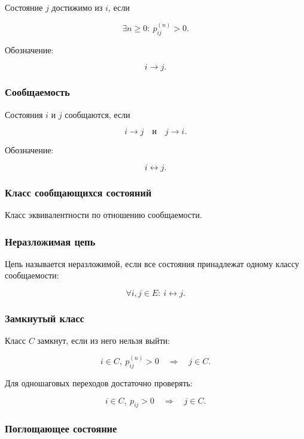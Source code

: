 \documentclass[
  11pt,
  a4paper,
]{article}
\begin{document}
Состояние \(j\) достижимо из \(i\), если

\[
\exists n\ge0:\ p_{ij}^{(n)}>0.
\]

Обозначение:

\[
i\to j.
\]

\subsubsection{Сообщаемость}\label{ux441ux43eux43eux431ux449ux430ux435ux43cux43eux441ux442ux44c}

Состояния \(i\) и \(j\) сообщаются, если

\[
i\to j
\quad\text{и}\quad
j\to i.
\]

Обозначение:

\[
i\leftrightarrow j.
\]

\subsubsection{Класс сообщающихся
состояний}\label{ux43aux43bux430ux441ux441-ux441ux43eux43eux431ux449ux430ux44eux449ux438ux445ux441ux44f-ux441ux43eux441ux442ux43eux44fux43dux438ux439}

Класс эквивалентности по отношению сообщаемости.

\subsubsection{Неразложимая
цепь}\label{ux43dux435ux440ux430ux437ux43bux43eux436ux438ux43cux430ux44f-ux446ux435ux43fux44c}

Цепь называется неразложимой, если все состояния принадлежат одному
классу сообщаемости:

\[
\forall i,j\in E:\ i\leftrightarrow j.
\]

\subsubsection{Замкнутый
класс}\label{ux437ux430ux43cux43aux43dux443ux442ux44bux439-ux43aux43bux430ux441ux441}

Класс \(C\) замкнут, если из него нельзя выйти:

\[
i\in C,\ p_{ij}^{(n)}>0
\quad\Rightarrow\quad
j\in C.
\]

Для одношаговых переходов достаточно проверять:

\[
i\in C,\ p_{ij}>0
\quad\Rightarrow\quad
j\in C.
\]

\subsubsection{Поглощающее
состояние}\label{ux43fux43eux433ux43bux43eux449ux430ux44eux449ux435ux435-ux441ux43eux441ux442ux43eux44fux43dux438ux435}
\end{document}

